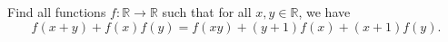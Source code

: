 Find all functions $f:\mathbb{R}\to\mathbb{R}$ such that for all $x, y\in\mathbb{R}$,  we have\[f(x+y)+f(x)f(y)=f(xy)+(y+1)f(x)+(x+1)f(y).\]